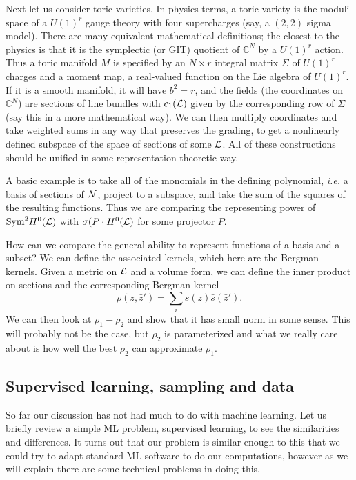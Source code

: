 \documentclass[12pt]{article}
\def\IC{\mathbb{C}}
\def\CN {{\cal N}}
\def\CL {{\cal L}}
\newcommand{\be}{\begin{equation}}
\newcommand{\ee}{\end{equation}}
\begin{document}
Next let us consider toric varieties.  In physics terms, a toric variety is the moduli space of a
$U(1)^r$ gauge theory with four supercharges (say, a $(2,2)$ sigma model).  There are many
equivalent mathematical definitions; the closest to the physics is that it is the symplectic (or GIT) quotient
of $\IC^N$ by a $U(1)^r$ action.  Thus a toric manifold $M$ is specified by 
an $N\times r$ integral matrix $\Sigma$ of $U(1)^r$  charges and a moment map, a real-valued function on the
Lie algebra of $U(1)^r$.  If it is a smooth manifold, it will have $b^2=r$, and the fields (the coordinates
on $\IC^N$) are sections of line bundles with $c_1(\CL)$ given by the corresponding row of $\Sigma$
(say this in a more mathematical way).  We can then multiply coordinates and take weighted sums in any way that
preserves the grading, to get a nonlinearly defined subspace of the space of sections of some $\CL$.
All of these constructions should be unified in some representation theoretic way.

A basic example is to take all of the monomials in the defining polynomial, {\it i.e.} a basis of sections of $\CN$,
project to a subspace, and take the sum of the squares of the resulting functions.  Thus we are comparing the
representing power of $\mbox{Sym}^2 H^0(\CL)$ with $\sigma(P\cdot H^0(\CL)$ for some projector $P$.

How can we compare the general ability to represent functions of a basis and a subset?
We can define the associated kernels, which here are the Bergman kernels.  Given a metric on
$\CL$ and a volume form, we can define the inner product on sections and the corresponding Bergman
kernel
\be
\rho(z,\bar z') = \sum_i s(z)\bar s(\bar z') .
\ee
We can then look at $\rho_1-\rho_2$ and show that it has small norm in some sense.
This will probably not be the case, but $\rho_2$ is parameterized and what we really care about is
how well the best $\rho_2$ can approximate $\rho_1$.


\subsection{ Supervised learning, sampling and data }

So far our discussion has not had much to do with machine learning.  Let us briefly review a simple
ML problem, supervised learning, to see the similarities and differences.  It turns out that our problem is similar enough
to this that we could try to adapt standard ML software to do our computations, however as we will
explain there are some technical problems in doing this.
\end{document}
